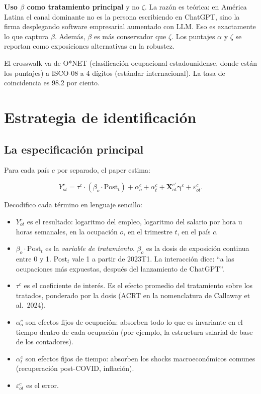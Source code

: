 \documentclass[12pt]{article}
\begin{document}
\textbf{Uso $\beta$ como tratamiento principal} y no $\zeta$. La razón es teórica: en América Latina el canal dominante no es la persona escribiendo en ChatGPT, sino la firma desplegando software empresarial aumentado con LLM. Eso es exactamente lo que captura $\beta$. Además, $\beta$ es más conservador que $\zeta$. Los puntajes $\alpha$ y $\zeta$ se reportan como exposiciones alternativas en la robustez.

El crosswalk va de O*NET (clasificación ocupacional estadounidense, donde están los puntajes) a ISCO-08 a 4 dígitos (estándar internacional). La tasa de coincidencia es 98.2 por ciento.

\section{Estrategia de identificación}

\subsection{La especificación principal}

Para cada país $c$ por separado, el paper estima:

\[
Y_{ot}^c = \tau^c \cdot (\beta_o \cdot \text{Post}_t) + \alpha_o^c + \alpha_t^c + \mathbf{X}_{ot}^{c\prime}\boldsymbol{\gamma}^c + \varepsilon_{ot}^c.
\]

Decodifico cada término en lenguaje sencillo:

\begin{itemize}
  \item $Y_{ot}^c$ es el resultado: logaritmo del empleo, logaritmo del salario por hora u horas semanales, en la ocupación $o$, en el trimestre $t$, en el país $c$.
  \item $\beta_o \cdot \text{Post}_t$ es la \emph{variable de tratamiento}. $\beta_o$ es la dosis de exposición continua entre 0 y 1. $\text{Post}_t$ vale 1 a partir de 2023T1. La interacción dice: ``a las ocupaciones más expuestas, después del lanzamiento de ChatGPT''.
  \item $\tau^c$ es el coeficiente de interés. Es el efecto promedio del tratamiento sobre los tratados, ponderado por la dosis (ACRT en la nomenclatura de Callaway et al.\ 2024).
  \item $\alpha_o^c$ son efectos fijos de ocupación: absorben todo lo que es invariante en el tiempo dentro de cada ocupación (por ejemplo, la estructura salarial de base de los contadores).
  \item $\alpha_t^c$ son efectos fijos de tiempo: absorben los shocks macroeconómicos comunes (recuperación post-COVID, inflación).
  \item $\varepsilon_{ot}^c$ es el error.
\end{itemize}
\end{document}
